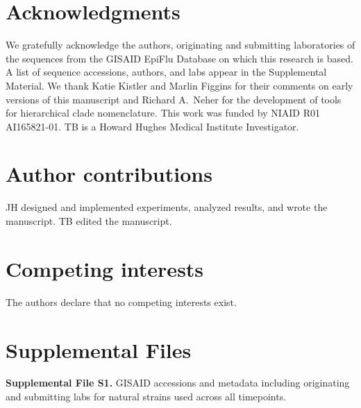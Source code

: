 \documentclass[9pt,lineno]{elife}
\begin{document}
\section*{Acknowledgments}

We gratefully acknowledge the authors, originating and submitting laboratories of the sequences from the GISAID EpiFlu Database \citep{gisaid} on which this research is based.
A list of sequence accessions, authors, and labs appear in the Supplemental Material.
We thank Katie Kistler and Marlin Figgins for their comments on early versions of this manuscript and Richard A.\ Neher for the development of tools for hierarchical clade nomenclature.
This work was funded by NIAID R01 AI165821-01.
TB is a Howard Hughes Medical Institute Investigator.

\section*{Author contributions}

JH designed and implemented experiments, analyzed results, and wrote the manuscript.
TB edited the manuscript.

\section*{Competing interests}

The authors declare that no competing interests exist.

\section*{Supplemental Files}

\textbf{Supplemental File S1.} GISAID accessions and metadata including originating and submitting labs for natural strains used across all timepoints.


\end{document}

